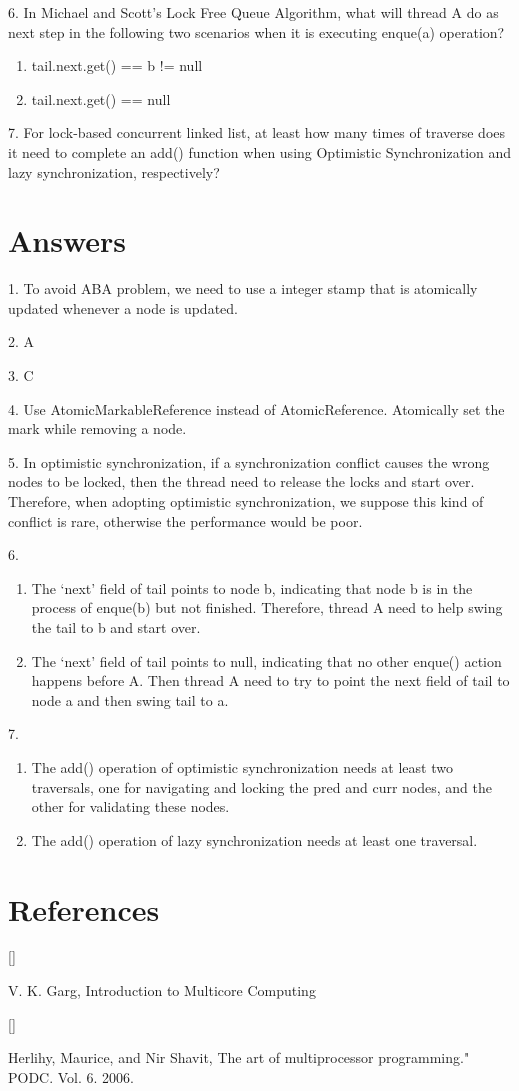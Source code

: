 \documentclass[twoside]{article}
\def\beginrefs{\begin{list}%
        {[\arabic{equation}]}{\usecounter{equation}
         \setlength{\leftmargin}{2.0truecm}\setlength{\labelsep}{0.4truecm}%
         \setlength{\labelwidth}{1.6truecm}}}
\def\endrefs{\end{list}}
\def\bibentry#1{\item[\hbox{[#1]}]}
\begin{document}
6. In Michael and Scott’s Lock Free Queue Algorithm, what will thread A do as next step in the following two scenarios when it is executing enque(a) operation?
\begin{enumerate} [label=(\alph*)]
\item tail.next.get() == b != null
\item tail.next.get() == null
\end{enumerate}

7. For lock-based concurrent linked list, at least how many times of traverse does it need to complete an add() function when using Optimistic Synchronization and lazy synchronization, respectively?

\section{Answers}

1. To avoid ABA problem, we need to use a integer stamp that is atomically updated whenever a node is updated.

2. A

3. C

4. Use AtomicMarkableReference instead of AtomicReference. Atomically set the mark while removing a node. 

5. In optimistic synchronization, if a synchronization conflict causes the wrong nodes to be locked, then the thread need to release the locks and start over. Therefore, when adopting optimistic synchronization, we suppose this kind of conflict is rare, otherwise the performance would be poor.

6. 
\begin{enumerate} [label=(\alph*)]
\item The ‘next’ field of tail points to node b, indicating that node b is in the process of enque(b) but not finished. Therefore, thread A need to help swing the tail to b and start over.
\item The ‘next’ field of tail points to null, indicating that no other enque() action happens before A. Then thread A need to try to point the next field of tail to node a and then swing tail to a.
\end{enumerate}

7. 
\begin{enumerate} [label=(\alph*)]
\item The add() operation of optimistic synchronization needs at least two traversals, one for navigating and locking the pred and curr nodes, and the other for validating these nodes.
\item The add() operation of lazy synchronization needs at least one traversal.
\end{enumerate}

\section*{References}
\beginrefs
\bibentry{1}{\sc V. K. Garg}, Introduction to Multicore Computing
\endrefs
\beginrefs
\bibentry{2}{\sc Herlihy, Maurice, and Nir Shavit}, The art of multiprocessor programming." PODC. Vol. 6. 2006.
\endrefs
\end{document}
